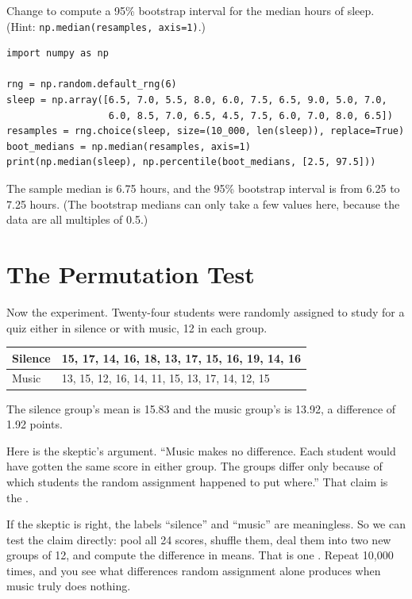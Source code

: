 \begin{Exercise}[title={Bootstrapping a Median}, label=si_median]
Change  to compute a 95\% bootstrap interval for the median hours of sleep.
(Hint: \texttt{np.median(resamples, axis=1)}.)
\end{Exercise}
\begin{Answer}[ref=si_median]
\begin{verbatim}
import numpy as np

rng = np.random.default_rng(6)
sleep = np.array([6.5, 7.0, 5.5, 8.0, 6.0, 7.5, 6.5, 9.0, 5.0, 7.0,
                  6.0, 8.5, 7.0, 6.5, 4.5, 7.5, 6.0, 7.0, 8.0, 6.5])
resamples = rng.choice(sleep, size=(10_000, len(sleep)), replace=True)
boot_medians = np.median(resamples, axis=1)
print(np.median(sleep), np.percentile(boot_medians, [2.5, 97.5]))
\end{verbatim}
The sample median is 6.75 hours, and the 95\% bootstrap interval is from 6.25 to 7.25 hours.
(The bootstrap medians can only take a few values here, because the data are all multiples of 0.5.)
\end{Answer}

\section{The Permutation Test}
Now the experiment. Twenty-four students were randomly assigned to study for a quiz either in
silence or with music, 12 in each group.
\begin{center}
\begin{tabular}{l|l}
Silence & 15, 17, 14, 16, 18, 13, 17, 15, 16, 19, 14, 16 \\
\hline
Music & 13, 15, 12, 16, 14, 11, 15, 13, 17, 14, 12, 15
\end{tabular}
\end{center}
The silence group's mean is 15.83 and the music group's is 13.92, a difference of 1.92 points.

Here is the skeptic's argument. ``Music makes no difference. Each student would have gotten the
same score in either group. The groups differ only because of which students the random assignment
happened to put where.'' That claim is the .

If the skeptic is right, the labels ``silence'' and ``music'' are meaningless. So we can test the
claim directly: pool all 24 scores, shuffle them, deal them into two new groups of 12, and compute
the difference in means. That is one . Repeat 10,000 times, and you see what
differences random assignment alone produces when music truly does nothing.

